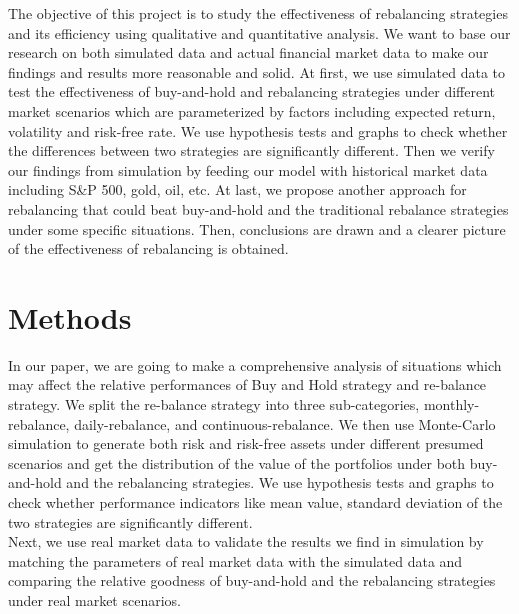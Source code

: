 \documentclass[
10pt, %
a4paper, %
oneside, %
headinclude,footinclude, %
BCOR5mm, %
]{scrartcl}
\begin{document}
The objective of this project is to study the effectiveness of rebalancing strategies and its efficiency using qualitative and quantitative analysis. We want to base our research on both simulated data and actual financial market data to make our findings and results more reasonable and solid. At first, we use simulated data to test the effectiveness of buy-and-hold and rebalancing strategies under different market scenarios which are parameterized by factors including expected return, volatility and risk-free rate. We use hypothesis tests and graphs to check whether the differences between two strategies are significantly different. Then we verify our findings from simulation by feeding our model with historical market data including S\&P 500, gold, oil, etc. At last, we propose another approach for rebalancing that could beat buy-and-hold and the traditional rebalance strategies under some specific situations. Then, conclusions are drawn and a clearer picture of the effectiveness of rebalancing is obtained.




\section{Methods}
In our paper, we are going to make a comprehensive analysis of situations which may affect the relative performances of Buy and Hold strategy and re-balance strategy. We split the re-balance strategy into three sub-categories, monthly-rebalance, daily-rebalance, and continuous-rebalance. We then use Monte-Carlo simulation to generate both risk and risk-free assets under different presumed scenarios and get the distribution of the value of the portfolios under both buy-and-hold and the rebalancing strategies. We use hypothesis tests and graphs to check whether performance indicators like mean value, standard deviation of the two strategies are significantly different.\\

Next, we use real market data to validate the results we find in simulation by matching the parameters of real market data with the simulated data and comparing the relative goodness of buy-and-hold and the rebalancing strategies under real market scenarios.\\
\end{document}
